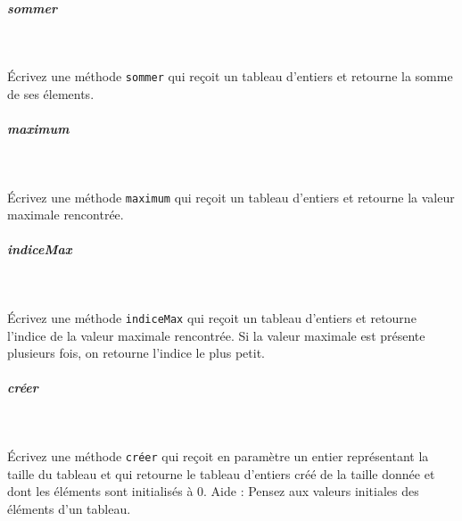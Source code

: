 \documentclass[11pt,a4paper]{article}
\begin{document}
			
		\subparagraph{sommer} 
		
					\textcolor{white}{.} \par
				
            \par
        
					\'Ecrivez une m\'ethode 
					\verb|sommer| 
					qui re\c coit un tableau d'entiers
					et retourne la somme de ses \'elements.
				
            \par
        
			
		\subparagraph{maximum} 
		
					\textcolor{white}{.} \par
				
            \par
        
					\'Ecrivez une m\'ethode 
					\verb|maximum| 
					qui re\c coit un tableau d'entiers
					et retourne la valeur maximale rencontr\'ee.
				
            \par
        
			
		\subparagraph{indiceMax} 
		
					\textcolor{white}{.} \par
				
            \par
        
					\'Ecrivez une m\'ethode 
					\verb|indiceMax|
					qui re\c coit un tableau d'entiers
					et retourne l'indice de la valeur maximale rencontr\'ee.
					Si la valeur maximale est pr\'esente plusieurs fois,
					on retourne l'indice le plus petit.
				
            \par
        
			
		\subparagraph{cr\'eer} 
		
					\textcolor{white}{.} \par
				
            \par
        
					\'Ecrivez une m\'ethode 
					\verb|créer| 
					qui re\c coit en param\`etre un entier repr\'esentant 
					la taille du tableau 
					et qui retourne le tableau d'entiers 
					cr\'e\'e de la taille donn\'ee 
					et dont les \'el\'ements sont initialis\'es \`a 0.
					Aide : Pensez aux valeurs initiales
					des \'el\'ements d'un tableau.
				
            \par
        
\end{document}
